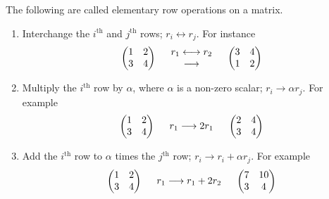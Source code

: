 \documentclass[11pt,a4paper]{article}
\theoremstyle{definition}
\begin{document}
The following are called elementary row operations on a matrix.
\begin{enumerate}
\item Interchange the $i^{\text{th}}$ and $j^{\text{th}}$ rows; $r_i\longleftrightarrow r_j$. For instance$$
\begin{pmatrix}
1&2\\3&4\\
\end{pmatrix}
\hspace{0.5cm} 
\begin{matrix}
r_1 \longleftrightarrow r_2\\ \longrightarrow\\
\end{matrix}
\hspace{0.5cm}
\begin{pmatrix}
3&4\\1&2\\
\end{pmatrix}
$$
\item Multiply the $i^{\text{th}}$ row by $\alpha$, where $\alpha$ is a non-zero scalar; $r_i\longrightarrow \alpha r_j$. For example
$$
\begin{pmatrix}
1&2\\3&4\\
\end{pmatrix}
\hspace{0.5cm}
\begin{matrix}
r_1\longrightarrow 2r_1\\
\end{matrix}
\hspace{0.5cm}
\begin{pmatrix}
2&4\\3&4\\
\end{pmatrix}
$$
\item Add the $i^{\text{th}}$ row to $\alpha$ times the $j^{\text{th}}$ row; $r_i\longrightarrow r_i+\alpha r_j$. For example
$$
\begin{pmatrix}
1&2\\3&4\\
\end{pmatrix}
\hspace{0.5cm}
\begin{matrix}
r_1\longrightarrow r_1+2r_2\\
\end{matrix}
\hspace{0.5cm}
\begin{pmatrix}
7&10\\3&4\\
\end{pmatrix}
$$
\end{enumerate}
\end{document}
